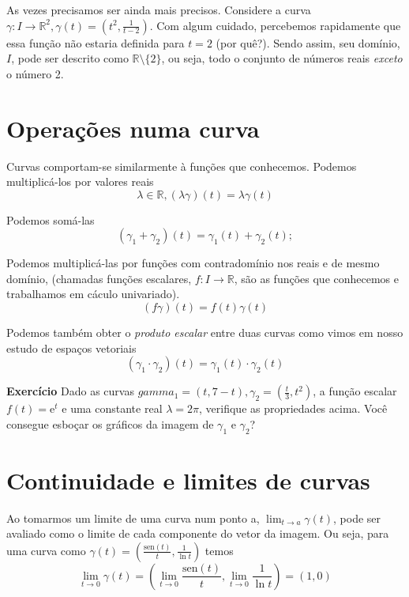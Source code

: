 \documentclass[
  portuguese,
  letterpaper,
  DIV=11,
  numbers=noendperiod]{scrreport}
\begin{document}
As vezes precisamos ser ainda mais precisos. Considere a curva
\(\gamma : I \rightarrow \mathbb{R}^2, \gamma(t) = \left(t^2, \frac{1}{t-2}\right)\).
Com algum cuidado, percebemos rapidamente que essa função não estaria
definida para \(t = 2\) (por quê?). Sendo assim, seu domínio, \(I\),
pode ser descrito como \(\mathbb{R} \setminus \{2\}\), ou seja, todo o
conjunto de números reais \emph{exceto} o número 2.

\section{Operações numa curva}\label{operauxe7uxf5es-numa-curva}

Curvas comportam-se similarmente à funções que conhecemos. Podemos
multiplicá-los por valores reais \[
\lambda \in \mathbb{R}, (\lambda\gamma)(t) = \lambda\gamma(t)
\]

Podemos somá-las \[
(\gamma_{1} + \gamma_{2})(t) = \gamma_{1}(t) + \gamma_{2}(t); 
\]

Podemos multiplicá-las por funções com contradomínio nos reais e de
mesmo domínio, (chamadas funções escalares,
\(f : I \rightarrow \mathbb{R}\), são as funções que conhecemos e
trabalhamos em cáculo univariado). \[
(f\gamma)(t) = f(t)\gamma(t)
\]

Podemos também obter o \emph{produto escalar} entre duas curvas como
vimos em nosso estudo de espaços vetoriais \[
(\gamma_{1} \cdot \gamma_{2})(t) = \gamma_{1}(t) \cdot \gamma_{2}(t)
\]

\textbf{Exercício} Dado as curvas
\(gamma_{1} = (t, 7 - t), \gamma_{2} = \left(\frac{t}{3}, t^2\right)\),
a função escalar \(f(t) = \mathrm{e}^t\) e uma constante real
\(\lambda = 2\pi\), verifique as propriedades acima. Você consegue
esboçar os gráficos da imagem de \(\gamma_{1}\) e \(\gamma_{2}\)?

\section{Continuidade e limites de
curvas}\label{continuidade-e-limites-de-curvas}

Ao tomarmos um limite de uma curva num ponto a,
\(\lim_{t\rightarrow a} \gamma(t)\), pode ser avaliado como o limite de
cada componente do vetor da imagem. Ou seja, para uma curva como
\(\gamma(t) = \left(\frac{\mathrm{sen}(t)}{t}, \frac{1}{\ln{t}}\right)\)
temos \[
\lim_{t\rightarrow 0}\gamma(t) = \left(\lim_{t\rightarrow 0} \frac{\mathrm{sen}(t)}{t}, 
\lim_{t\rightarrow 0} \frac{1}{\ln{t}}\right)  = (1, 0)
\]
\end{document}
